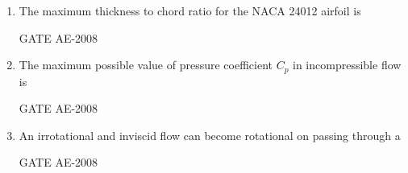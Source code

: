 \documentclass[journal,12pt,onecolumn]{IEEEtran}
\theoremstyle{remark}
\begin{document}
\begin{enumerate}
\quad

\item The maximum thickness to chord ratio for the NACA 24012 airfoil is  \\
\begin{enumerate}
\end{enumerate}
\hfill{GATE AE-2008}

\quad

\item The maximum possible value of pressure coefficient \(C_p\) in incompressible flow is \\
\begin{enumerate}
\end{enumerate}
\hfill{GATE AE-2008}

\quad

\item An irrotational and inviscid flow can become rotational on passing through a \\
\begin{enumerate}
\end{enumerate}
\hfill{GATE AE-2008}


\end{enumerate}
\end{document}
